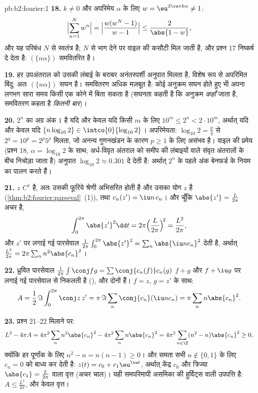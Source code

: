 \begin{solution}{pb:b2:fourier:1}
\textbf{18.} $k \neq 0$ और अपरिमेय $\alpha$ के लिए $w =
\eu^{2\iu\pi k\alpha} \neq 1$:
\[
\Bigl|\sum_{n=1}^{N}w^n\Bigr|
= \Bigl|\frac{w(w^N - 1)}{w - 1}\Bigr|
\leq \frac{2}{\abs{1 - w}} ,
\]
और यह परिबंध $N$ से स्वतंत्र है; $N$ से भाग देने पर वाइल की कसौटी मिल
जाती है, और प्रश्न 17 निष्कर्ष दे देता है: $(\{n\alpha\})$ समवितरित है।

\textbf{19.} हर उपअंतराल को उसकी लंबाई के बराबर अनंतस्पर्शी अनुपात मिलता
है, विशेष रूप से अपरिमित बिंदु: अतः $(\{n\alpha\})$ सघन है। समवितरण अधिक मज़बूत है:
कोई अनुक्रम सघन होते हुए भी अपना लगभग सारा समय किसी एक कोने में बिता सकता
है (सघनता कहती है कि अनुक्रम \emph{कहाँ} जाता है, समवितरण कहता है
\emph{कितनी बार})।

\textbf{20.} $2^n$ का अग्र अंक $1$ है यदि और केवल यदि किसी $m$ के लिए $10^m \leq 2^n <
2\cdot10^m$,
अर्थात् यदि और केवल यदि $\{n\log_{10}2\} \in
\intco{0}{\log_{10}2}$। अपरिमेयता: $\log_{10}2 =
\frac pq$ से $2^q = 10^p = 2^p5^p$ मिलता, जो अनन्य
गुणनखंडन के कारण $p
\geq 1$ के लिए असंभव है। वाइल की प्रमेय (प्रश्न 18, $\alpha = \log_{10}2$ के
साथ; अर्ध-विवृत अंतराल को समीप की लंबाइयों वाले संवृत अंतरालों के बीच
निचोड़ा जाता है) अनुपात $\log_{10}2 \approx 0.301$ दे देती है: अर्थात् $2^n$ के पहले अंक बेनफर्ड
के नियम का पालन करते हैं।

\textbf{21.} $z$ $C^1$ है, अतः उसकी फूरिये श्रेणी  अभिसरित
होती है और उसका योग $z$ है (\cref{thm:b2:fourier:parseval}~(1)), तथा $c_n(z') = \iu n\,c_n$। और चूँकि $\abs{z'} = \frac{L}{2\pi}$ अचर है,
\[
\int_0^{2\pi}\abs{z'}^2\dd t
= 2\pi\Bigl(\frac{L}{2\pi}\Bigr)^{\!2}
= \frac{L^2}{2\pi} ,
\]
और  $z'$ पर लगाई गई पारसेवाल $\frac{1}{2\pi}\int_0^{2\pi}\abs{z'}^2 =
\sum_n\abs{\iu nc_n}^2$ देती है, अर्थात् $\frac{L^2}{2\pi} = 2\pi\sum_n
n^2\abs{c_n}^2$।

\textbf{22.} ध्रुवित पारसेवाल $\frac{1}{2\pi}\int\conj
fg = \sum\conj{c_n(f)}c_n(g)$ $f + g$ और $f + \iu g$ पर लगाई गई पारसेवाल से निकलती
है (), और दोनों  हैं। $f = z$, $g = z'$ के साथ:
\[
A = \frac12\,\Im\int_0^{2\pi}\conj z\,z'
= \pi\,\Im\sum_n\conj{c_n}(\iu n c_n)
= \pi\sum_n n\abs{c_n}^2 .
\]

\textbf{23.} प्रश्न 21--22 मिलाने पर:
\[
L^2 - 4\pi A
= 4\pi^2\sum_n n^2\abs{c_n}^2 -
4\pi^2\sum_n n\abs{c_n}^2
= 4\pi^2\sum_{n\in\Z}(n^2 - n)\abs{c_n}^2 \geq 0 ,
\]
क्योंकि हर पूर्णांक के लिए $n^2 - n = n(n-1) \geq 0$। और समता सभी $n \notin \{0, 1\}$ के लिए $c_n = 0$ को बाध्य कर
देती है: $z(t) = c_0 +
c_1\eu^{\iu t}$, अर्थात् केंद्र $c_0$ और त्रिज्या $\abs{c_1} = \frac{L}{2\pi}$ वाला वृत्त (अचर चाल)।
यही समपरिमापी असमिका की हुर्विट्स वाली उपपत्ति है: $A \leq \frac{L^2}{4\pi}$, और केवल वृत्त।


\end{solution}
